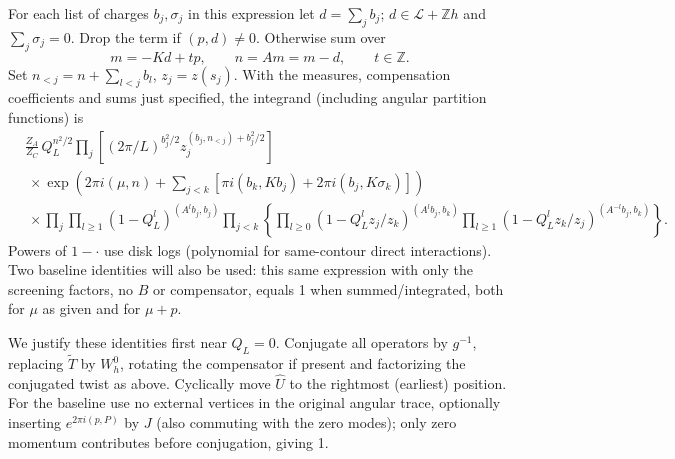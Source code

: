 For each list of charges \(b_j,\sigma_j\) in this expression let \(d=\sum_j b_j\); \(d\in\mathcal L+\mathbb Z h\) and \(\sum_j\sigma_j=0\). Drop the term if \((p,d)\ne0\). Otherwise sum over
\[
 m=-K d+t p,\qquad n=A m=m-d,\qquad t\in\mathbb Z .
\]
Set \(n_{<j}=n+\sum_{l<j}b_l\), \(z_j=z(s_j)\). With the measures, compensation coefficients and sums just specified, the integrand (including angular partition functions) is
\begin{equation}
\begin{split}
 &\frac{Z_A}{Z_C}\, Q_L^{n^2/2}
     \prod_j\left[(2\pi/L)^{b_j^2/2} z_j^{(b_j,n_{<j})+b_j^2/2}\right]\\
 &\ \times\exp\!\left(2\pi i(\mu,n)+\sum_{j<k}[\pi i(b_k,K b_j)+2\pi i(b_j,K\sigma_k)]\right)\\
 &\ \times\prod_j\prod_{l\ge1}(1-Q_L^l)^{(A^l b_j,b_j)}
  \prod_{j<k}
  \left\{\prod_{l\ge0}(1-Q_L^l z_j/z_k)^{(A^l b_j,b_k)}
         \prod_{l\ge1}(1-Q_L^l z_k/z_j)^{(A^{-l} b_j,b_k)}\right\}.            \end{split}
\label{c4:Ang-2}
\end{equation}
Powers of \(1-\cdot\) use disk logs (polynomial for same-contour direct interactions). Two baseline identities will also be used: this same expression with only the screening factors, no \(B\) or compensator, equals 1 when summed/integrated, both for \(\mu\) as given and for \(\mu+p\).

We justify these identities first near \(Q_L=0\). Conjugate all operators by \(g^{-1}\), replacing \(\widetilde T\) by \(W_h^0\), rotating the compensator if present and factorizing the conjugated twist as above. Cyclically move \(\widehat U\) to the rightmost (earliest) position. For the baseline use no external vertices in the original angular trace, optionally inserting \(e^{2\pi i(p,P)}\) by \(J\) (also commuting with the zero modes); only zero momentum contributes before conjugation, giving 1.

